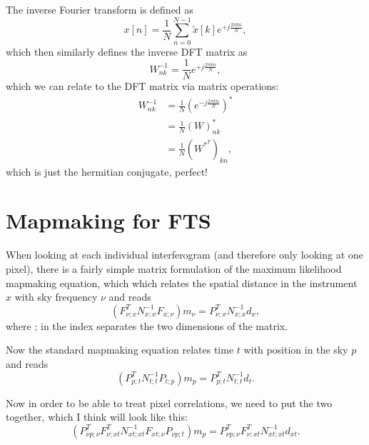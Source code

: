 \documentclass{article}
\begin{document}
The inverse Fourier transform is defined as
\begin{equation}
	x[n]=\frac{1}{N} \sum_{n=0}^{N-1} \tilde x[k] e^{+j\frac{2\pi kn}{N}},
\end{equation}
which then similarly defines the inverse DFT matrix as
\begin{equation}
	W^{-1}_{nk} = \frac{1}{N} e^{+j\frac{2\pi kn}{N}},
\end{equation}
which we can relate to the DFT matrix via matrix operations:
\begin{align}
	W^{-1}_{nk} &= \frac{1}{N} (e^{-j\frac{2\pi kn}{N}})^*\\
	&= \frac{1}{N} (W)^*_{nk}\\
	&= \frac{1}{N} (W^{*^T})_{kn},
\end{align}
which is just the hermitian conjugate, perfect!

\section{Mapmaking for FTS}

When looking at each individual interferogram (and therefore only looking at one pixel), there is a fairly simple matrix formulation of the maximum likelihood mapmaking equation, which which relates the spatial distance in the instrument $x$ with sky frequency $\nu$ and reads
\begin{equation}
	(F^T_{\nu; x} N^{-1}_{x;x} F_{x;\nu}) m_\nu = P^T_{\nu; x} N^{-1}_{x;x} d_x,
\end{equation}
where ; in the index separates the two dimensions of the matrix.

Now the standard mapmaking equation relates time $t$ with position in the sky $p$ and reads
\begin{equation}
	(P^T_{p;t} N^{-1}_{t;t} P_{t;p})m_p = P^T_{p;t} N^{-1}_{t;t}d_t.
\end{equation}

Now in order to be able to treat pixel correlations, we need to put the two together, which I think will look like this:
\begin{equation}
	(P^T_{\nu p;\nu}F^T_{\nu;xt} N^{-1}_{xt;xt} F_{xt;\nu}P_{\nu p;t})m_p = P^T_{\nu p;\nu}F^T_{\nu;xt} N^{-1}_{xt;xt}d_{xt}.
\end{equation}
 
%



\end{document}
